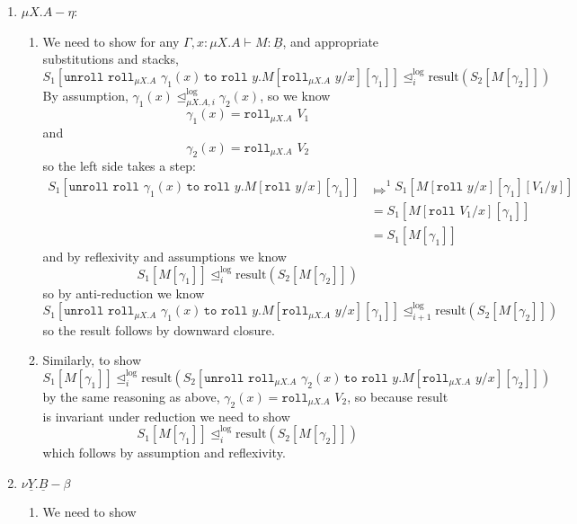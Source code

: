 \documentclass[acmsmall,nonacm]{acmart}
\renewcommand{\u}{\underline}
\newcommand{\apreorder}{\trianglelefteq}
\newcommand{\itylrof}[3]{\ilrof{#1}{#3,#2}}
\newcommand{\ilrof}[2]{\mathrel{{#1}^{\text{log}}_{#2}}}
\newcommand{\itylr}[2]{\itylrof{\apreorder}{#1}{#2}}
\newcommand{\ilr}[1]{\ilrof{\apreorder}{#1}}
\newcommand{\bigstepsin}[1]{\mathrel{\Mapsto^{#1}}}
\newcommand{\roll}{\kw{roll}}
\newcommand{\rollty}[1]{\texttt{roll}_{#1}\,\,}
\newcommand{\result}{\text{result}}
\newcommand{\kw}[1]{\texttt{#1}\,\,}
\newcommand{\pmmuXtoYinZ}[3]{\kw{unroll} #1 \,\kw{to} \roll #2. #3}
\begin{document}
{\begin{longproof}
\begin{enumerate}
\begin{enumerate}
    \item For the other direction we need to show
      \[ S_1[M[\gamma_1,V[\gamma_1]/x]] \ilr i \result(S_2[\pmmuXtoYinZ {\rollty{\mu X.A} V[\gamma_2]} x M[\gamma_2]]) \]
      Since results are invariant under steps, this is the same as
      \[ S_1[M[\gamma_1,V[\gamma_1]/x]] \ilr i \result(S_2[M[\gamma_2,V[\gamma_2/x]]]) \]
      which follows by reflexivity and assumptions about the stacks
      and substitutions.
    \end{enumerate}
  \item $\mu X.A-\eta$:
    \begin{enumerate}
    \item We need to show for any $\Gamma, x : \mu X. A \vdash M : \u B$,
      and appropriate substitutions and stacks,
      \[ S_1[\pmmuXtoYinZ {\rollty{\mu X.A} {\gamma_1(x)}} {y}  M[\rollty{\mu X.A}y/x][\gamma_1]] \ilr i \result(S_2[M[\gamma_2]]) \]
      By assumption, $\gamma_1(x) \itylr i {\mu X.A} \gamma_2(x)$, so we know
      \[ \gamma_1(x) = \rollty{\mu X.A} V_1 \]
      and
      \[ \gamma_2(x) = \rollty{\mu X.A} V_2 \]
      so the left side takes a step:
      \begin{align*}
        S_1[\pmmuXtoYinZ {\roll {\gamma_1(x)}} {y}  M[\roll y/x][\gamma_1]]
        &\bigstepsin{1} S_1[M[\roll y/x][\gamma_1][V_1/y]]\\
        &= S_1[M[\roll V_1/x][\gamma_1]]\\
        & = S_1[M[\gamma_1]]
      \end{align*}
      and by reflexivity and assumptions we know
      \[ S_1[M[\gamma_1]] \ilr {i} \result(S_2[M[\gamma_2]]) \]
      so by anti-reduction we know 
      \[ S_1[\pmmuXtoYinZ {\rollty{\mu X.A} {\gamma_1(x)}} {y}  M[\rollty{\mu X.A}y/x][\gamma_1]] \ilr {i+1} \result(S_2[M[\gamma_2]]) \]
      so the result follows by downward closure.
    \item Similarly, to show
      \[ S_1[M[\gamma_1]] \ilr i \result(S_2[\pmmuXtoYinZ {\rollty{\mu X.A} {\gamma_2(x)}} {y}  M[\rollty{\mu X.A}y/x][\gamma_2]]) \]
      by the same reasoning as above, $\gamma_2(x) = \rollty{\mu X.A}V_2$, so because result is invariant under reduction we need to show
      \[ S_1[M[\gamma_1]] \ilr i \result(S_2[M[\gamma_2]]) \]
      which follows by assumption and reflexivity.
    \end{enumerate}
  \item $\nu \u Y. \u B-\beta$
    \begin{enumerate}
    \item We need to show

\end{enumerate}
\end{enumerate}
\end{longproof}}
\end{document}
